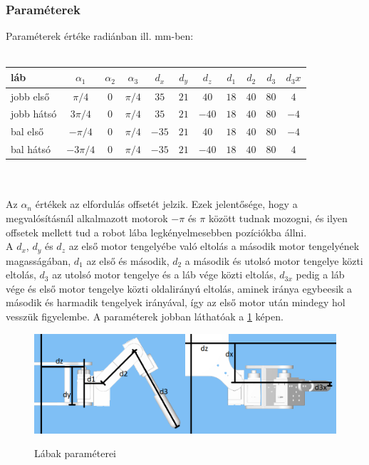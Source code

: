 \documentclass{article}
\begin{document}
\subsubsection{Paraméterek}
Paraméterek értéke radiánban ill. mm-ben:\\\\
\begin{tabular}{ | l | c | c | c | c | c | c | c | c | c | c | }
	\hline
	láb&$\alpha_1$&$\alpha_2$&$\alpha_3$&$d_x$&$d_y$&$d_z$&$d_1$&$d_2$&$d_3$&$d_3x$\\
	\hline
	jobb első&$\pi/4$&$0$&$\pi/4$&$35$&$21$&$40$&$18$&$40$&$80$&$4$\\
	\hline
	jobb hátsó&$3\pi/4$&$0$&$\pi/4$&$35$&$21$&$-40$&$18$&$40$&$80$&$-4$\\
	\hline
	bal első&$-\pi/4$&$0$&$\pi/4$&$-35$&$21$&$40$&$18$&$40$&$80$&$-4$\\
	\hline
	bal hátsó&$-3\pi/4$&$0$&$\pi/4$&$-35$&$21$&$-40$&$18$&$40$&$80$&$4$\\
	\hline
\end{tabular}\\\\
Az $\alpha_n$ értékek az elfordulás offsetét jelzik. Ezek jelentősége, hogy a megvalósításnál alkalmazott motorok $-\pi$ és $\pi$ között tudnak mozogni, és ilyen offsetek mellett tud a robot lába legkényelmesebben pozíciókba állni.\\
A $d_x$, $d_y$ és $d_z$ az első motor tengelyébe való eltolás a második motor tengelyének magasságában,	$d_1$ az első és második, $d_2$ a második és utolsó motor tengelye közti eltolás, $d_3$ az utolsó motor tengelye és a láb vége közti eltolás, $d_{3x}$ pedig a láb vége és első motor tengelye közti oldalirányú eltolás, aminek iránya egybeesik a második és harmadik tengelyek irányával, így az első motor után mindegy hol vesszük figyelembe. A paraméterek jobban láthatóak a \ref{fig:param} képen.
\begin{figure}[h]
\begin{minipage}{0.9\textwidth}
	\caption{Lábak paraméterei}
	\includegraphics[width=\textwidth]{quad_params}
	\label{fig:param}
\end{minipage}
\end{figure}
\end{document}
